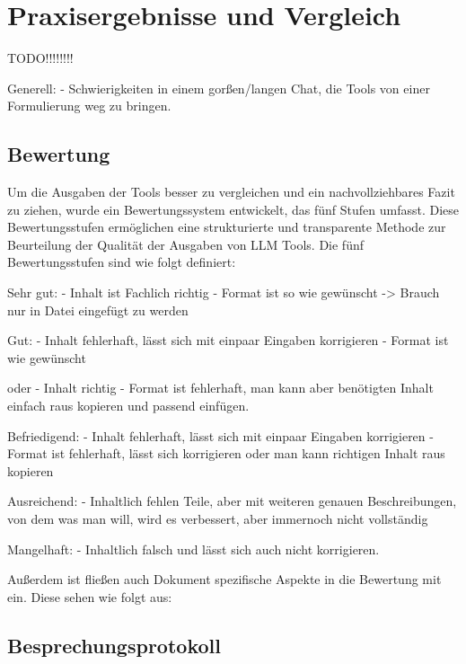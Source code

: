 
\chapter{Praxisergebnisse und Vergleich} 

TODO!!!!!!!!

Generell:
    - Schwierigkeiten in einem gorßen/langen Chat, die Tools von einer Formulierung weg zu bringen. 


\section{Bewertung}  \label{BewertungLLMTools}

Um die Ausgaben der Tools besser zu vergleichen und ein nachvollziehbares Fazit zu ziehen, wurde ein Bewertungssystem 
entwickelt, das fünf Stufen umfasst. Diese Bewertungsstufen ermöglichen eine strukturierte und transparente Methode 
zur Beurteilung der Qualität der Ausgaben von LLM Tools. Die fünf Bewertungsstufen sind wie folgt definiert:

Sehr gut:
- Inhalt ist Fachlich richtig
- Format ist so wie gewünscht
-> Brauch nur in Datei eingefügt zu werden

Gut:
- Inhalt fehlerhaft, lässt sich mit einpaar Eingaben korrigieren
- Format ist wie gewünscht

oder
- Inhalt richtig
- Format ist fehlerhaft, man kann aber benötigten Inhalt einfach raus kopieren und passend einfügen.

Befriedigend:
- Inhalt fehlerhaft, lässt sich mit einpaar Eingaben korrigieren
- Format ist fehlerhaft, lässt sich korrigieren oder man kann richtigen Inhalt raus kopieren

Ausreichend:
- Inhaltlich fehlen Teile, aber mit weiteren genauen Beschreibungen, von dem was man will, wird es verbessert, aber 
immernoch nicht vollständig

Mangelhaft:
- Inhaltlich falsch und lässt sich auch nicht korrigieren.

Außerdem ist fließen auch Dokument spezifische Aspekte in die Bewertung mit ein. Diese sehen wie folgt aus:



\section{Besprechungsprotokoll}  \label{CompBesprechungsprotokoll}

